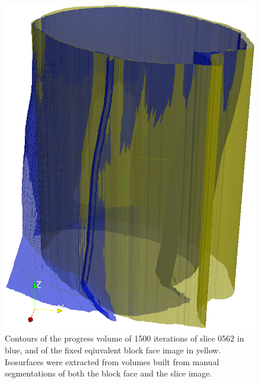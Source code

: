   \begin{figure}[htbp]
    \centering
    \includegraphics[width=\pagewidth]{Ch6/Figs/diagnostics/0562_contour.png}
    \caption{Contours of the progress volume of 1500 iterations of slice 0562 in blue, and of the fixed eqiuvalent block face image in yellow. Isosurfaces were extracted from volumes built from manual segmentations of both the block face and the slice image.}
    \label{fig:progress_contour}
  \end{figure}
      
